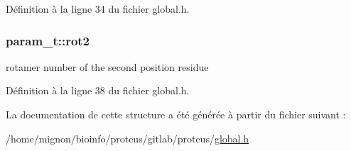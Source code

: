 Définition à la ligne 34 du fichier global.\+h.

\hypertarget{structparam__t_a491b269791ac121473a9f7145b283cdc}{
\subsubsection[{rot2}]{ param\+\_\+t\+::rot2}}\label{structparam__t_a491b269791ac121473a9f7145b283cdc}


rotamer number of the second position residue 



Définition à la ligne 38 du fichier global.\+h.



La documentation de cette structure a été générée à partir du fichier suivant \+:\begin{DoxyCompactItemize}
\item 
/home/mignon/bioinfo/proteus/gitlab/proteus/\hyperlink{global_8h}{global.\+h}\end{DoxyCompactItemize}
